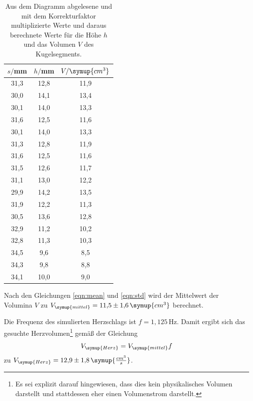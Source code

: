 \begin{table}[htp]
	\begin{center}
    \caption{Aus dem Diagramm abgelesene und mit dem Korrekturfaktor multiplizierte Werte und
    daraus berechnete Werte für die Höhe $h$ und das Volumen $V$ des Kugelsegments.}
    \label{tab:herz}
		\begin{tabular}{ccc}
		\toprule
			{$s/$mm} & {$h/$mm} & {$V/\symup{cm^3}$}\\
			\midrule
			31,3 & 12,8 & 11,9\\
			30,0 & 14,1 & 13,4\\
			30,1 & 14,0 & 13,3\\
			31,6 & 12,5 & 11,6\\
			30,1 & 14,0 & 13,3\\
			31,3 & 12,8 & 11,9\\
			31,6 & 12,5 & 11,6\\
			31,5 & 12,6 & 11,7\\
			31,1 & 13,0 & 12,2\\
			29,9 & 14,2 & 13,5\\
			31,9 & 12,2 & 11,3\\
			30,5 & 13,6 & 12,8\\
			32,9 & 11,2 & 10,2\\
			32,8 & 11,3 & 10,3\\
			34,5 & 9,6 & 8,5\\
			34,3 & 9,8 & 8,8\\
			34,1 & 10,0 & 9,0\\
		\bottomrule
		\end{tabular}
	\end{center}
\end{table}

Nach den Gleichungen \eqref{eqn:mean} und \eqref{eqn:std} wird der Mittelwert
der Volumina $V$ zu $V_{\symup{mittel}}=11{,}5\pm1{,}6\,\symup{cm^3}$ berechnet.

Die Frequenz des simulierten Herzschlags ist $f=1{,}125\,$Hz. Damit ergibt sich
das gesuchte Herzvolumen\footnote{Es sei explizit darauf hingewiesen, dass dies kein
physikalisches Volumen darstellt und stattdessen eher einen Volumenstrom darstellt.} gemäß der Gleichung
\begin{equation}
  V_{\symup{Herz}} = V_{\symup{mittel}} f
\end{equation}
zu $V_{\symup{Herz}}=12{,}9\pm1{,}8\, \symup{\frac{cm^3}{s}}$.
